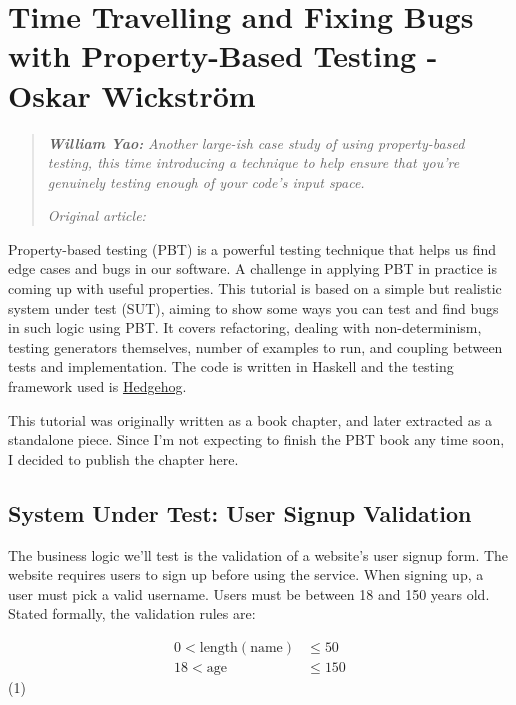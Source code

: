 \chapter{Time Travelling and Fixing Bugs with Property-Based Testing - Oskar Wickström}

\begin{quotation}
\noindent\textit{\textbf{William Yao:}}
\textit{Another large-ish case study of using property-based testing, this time introducing a technique to help ensure that you’re genuinely testing enough of your code’s input space.}

\vspace{\baselineskip}
\noindent\textit{Original article: \cite{time_travelling}}
\end{quotation}


Property-based testing (PBT) is a powerful testing technique that helps
us find edge cases and bugs in our software. A challenge in applying PBT
in practice is coming up with useful properties. This tutorial is based
on a simple but realistic system under test (SUT), aiming to show some
ways you can test and find bugs in such logic using PBT. It covers
refactoring, dealing with non-determinism, testing generators
themselves, number of examples to run, and coupling between tests and
implementation. The code is written in Haskell and the testing framework
used is \href{http://hackage.haskell.org/package/hedgehog}{Hedgehog}.

This tutorial was originally written as a book chapter, and later
extracted as a standalone piece. Since I'm not expecting to finish the
PBT book any time soon, I decided to publish the chapter here.

\section{System Under Test: User Signup
Validation}
\label{system-under-test-user-signup-validation}

The business logic we'll test is the validation of a website's user
signup form. The website requires users to sign up before using the
service. When signing up, a user must pick a valid username. Users must
be between 18 and 150 years old.
Stated formally, the validation rules are:

\begin{align*} 0 < \text{length}(\text{name}) &\leq 50 \\ 18 < \text{age} &\leq 150 \end{align*} \qquad(1)

